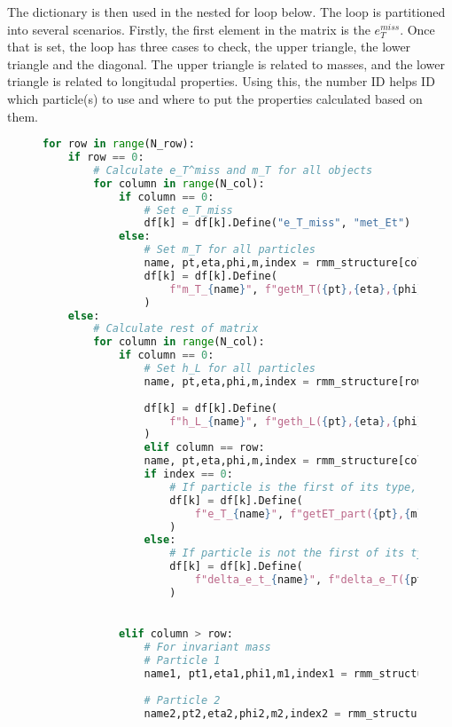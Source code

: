 The dictionary is then used in the nested for loop below. The loop is partitioned into several 
scenarios. Firstly, the first element in the matrix is the $e_T^{miss}$. Once that is set, 
the loop has three cases to check, the upper triangle, the lower triangle and the diagonal. 
The upper triangle is related to masses, and the lower triangle is related to longitudal properties. 
Using this, the number ID helps ID which particle(s) to use and where to put the properties 
calculated based on them.

\begin{figure}[H]
\begin{lstlisting}[language=Python, style=pythonstyle, label={code:RMM_implementation}]
for row in range(N_row):
    if row == 0:
        # Calculate e_T^miss and m_T for all objects
        for column in range(N_col):
            if column == 0:
                # Set e_T_miss
                df[k] = df[k].Define("e_T_miss", "met_Et") 
            else:
                # Set m_T for all particles
                name, pt,eta,phi,m,index = rmm_structure[column]
                df[k] = df[k].Define(
                    f"m_T_{name}", f"getM_T({pt},{eta},{phi},{m},{index})"
                )
    else:
        # Calculate rest of matrix
        for column in range(N_col):
            if column == 0:
                # Set h_L for all particles
                name, pt,eta,phi,m,index = rmm_structure[row]
                
                df[k] = df[k].Define(
                    f"h_L_{name}", f"geth_L({pt},{eta},{phi},{m},{index})"
                )
                elif column == row:
                name, pt,eta,phi,m,index = rmm_structure[column]
                if index == 0:
                    # If particle is the first of its type, calculate e_T of particle
                    df[k] = df[k].Define(
                        f"e_T_{name}", f"getET_part({pt},{m},{index})"
                    )
                else:
                    # If particle is not the first of its type, calculate the difference in e_T
                    df[k] = df[k].Define(
                        f"delta_e_t_{name}", f"delta_e_T({pt},{m},{index})"
                    )
                    

            elif column > row:
                # For invariant mass
                # Particle 1
                name1, pt1,eta1,phi1,m1,index1 = rmm_structure[row]
                
                # Particle 2
                name2,pt2,eta2,phi2,m2,index2 = rmm_structure[column]
        

\end{lstlisting}
\end{figure}
